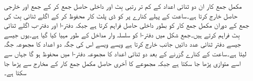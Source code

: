 مکمل جمع کار ان دو ثنائی اعداد کے کم تر رتبی    بِٹ اور داخلی حاصل     جمع  کر کے جمع    اور خارجی حاصل   خارج کرتا ہے۔ساعت کے پہلے کنارے پر  کو ڈی پلٹ کار محفوظ کر کے اگلے ثنائی  بِٹ کی جمع کے دوران  مکمل جمع کار کو  بطور داخلی حاصل فراہم کرتا ہے جبکہ دفتر-ا اور دفتر-ب  اگلے  ثنائی بِٹ فراہم کرتے ہیں۔جمع   شکل میں دفتر-ا کو سلسلہ وار مداخل کے طور مہیا کیا گیا ہے۔یوں جیسے جیسے  دفتر ثنائی عدد  دائیں جانب خارج  کرتا  ہے ویسے ویسے اس کی جگہ دو اعداد کا مجموعہ جگہ لیتا ہے۔ساعت کے  کنارے گزرنے کے بعد دو ثنائی اعداد کا مجموعہ دفتر-ا میں محفوظ ہو گا جہاں سے اسے متوازی پڑھا جا سکتا ہے جبکہ مجموعے کا آخری حاصل مکمل جمع کار کے مخارج   سے پڑھا جا سکتا ہے۔

